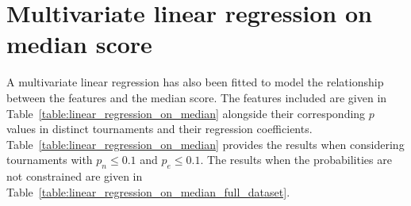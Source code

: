 \section{Multivariate linear regression on median score}\label{app:regression_median_score}

A multivariate linear regression has also been fitted to model the relationship
between the features and the median score. The features included are given in
Table~\ref{table:linear_regression_on_median} alongside their corresponding
\(p\) values in distinct tournaments and their regression coefficients.
Table~\ref{table:linear_regression_on_median} provides the results when
considering tournaments with \(p_n \leq 0.1\) and \(p_e \leq 0.1\). The results
when the probabilities are not constrained are given in
Table~\ref{table:linear_regression_on_median_full_dataset}.

